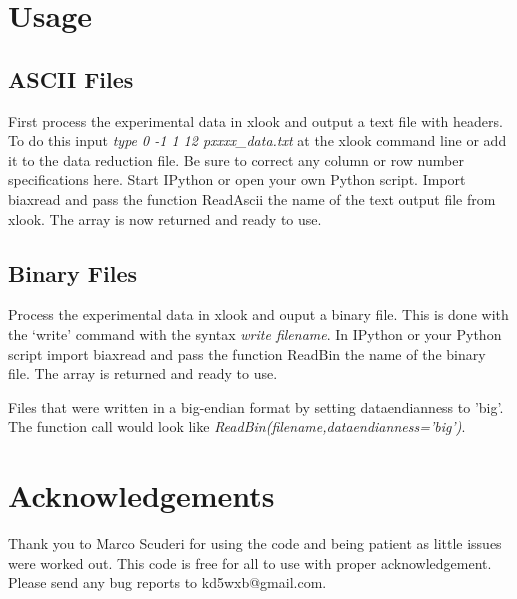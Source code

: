 \documentclass[a4paper,11pt,oneside]{article}
\begin{document}
\section{Usage}

\subsection{ASCII Files}
First process the experimental data in xlook and output a text file with headers.  To do this input \emph{type 0 -1 1 12 pxxxx\_data.txt} at the xlook command line or add it to the data reduction file.  Be sure to correct any column or row number specifications here.  Start IPython or open your own Python script.  Import biaxread and pass the function ReadAscii the name of the text output file from xlook.  The array is now returned and ready to use.  


\subsection{Binary Files}
Process the experimental data in xlook and ouput a binary file.  This is done with the `write' command with the syntax \emph{write filename}.  In IPython or your Python script import biaxread and pass the function ReadBin the name of the binary file.  The array is returned and ready to use.

Files that were written in a big-endian format by setting dataendianness to 'big'.  The function call would look like \emph{ReadBin(filename,dataendianness='big')}.

\section{Acknowledgements}
Thank you to Marco Scuderi for using the code and being patient as little issues were worked out.  This code is free for all to use with proper acknowledgement.  Please send any bug reports to kd5wxb@gmail.com.


\newpage
\end{document}
